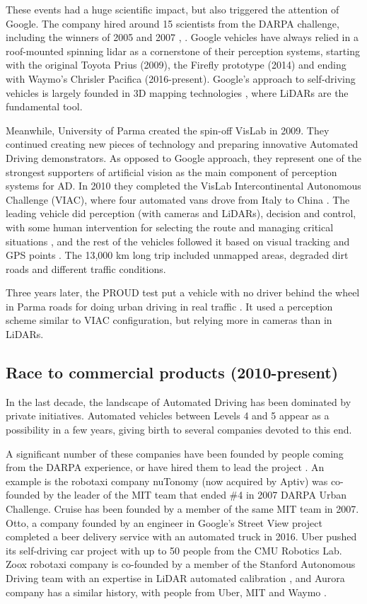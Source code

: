 These events had a huge scientific impact, but also triggered the attention of 
Google. The company hired around 15 scientists from the DARPA challenge, 
including the winners of 2005 and 2007 \cite{Montemerlo2008}, 
\cite{Levinson2011}. Google vehicles have always relied in a roof-mounted 
spinning lidar as a cornerstone of their perception systems, starting with the 
original Toyota Prius (2009), the Firefly prototype (2014) and ending with 
Waymo's Chrisler Pacifica (2016-present).
Google's approach to self-driving vehicles is largely founded in 3D mapping technologies \cite{Chapell2016}, where LiDARs are the fundamental tool.

Meanwhile, University of Parma created the spin-off VisLab in 2009. They 
continued creating new pieces of technology and preparing innovative Automated 
Driving demonstrators. As opposed to Google approach, they represent one of the 
strongest supporters of artificial vision as the main component of perception 
systems for AD. In 2010 they completed the VisLab Intercontinental Autonomous 
Challenge (VIAC), where four automated vans drove from Italy to China 
\cite{Bertozzi2011}.
The leading vehicle did perception (with cameras and LiDARs), decision and 
control, with some human intervention for selecting the route and managing 
critical situations \cite{Broggi2012}, and the rest of the vehicles followed 
it based on visual tracking and GPS points \cite{Broggi2012a}. The 13,000 km 
long trip included unmapped areas, degraded dirt roads and different traffic 
conditions. 

Three years later, the PROUD test put a vehicle with no driver behind the wheel in Parma roads for doing urban driving in real traffic \cite{Broggi2013}. It used a perception scheme similar to VIAC configuration, but relying more in cameras than in LiDARs.
 
\subsection{Race to commercial products (2010-present)}
 
In the last decade, the landscape of Automated Driving has been dominated by private initiatives. Automated vehicles between Levels 4 and 5 appear as a possibility in a few years, giving birth to several companies devoted to this end. 

A significant number of these companies have been founded by people coming from 
the DARPA experience, or have hired them to lead the project 
\cite{Chapell2016}. An example is the robotaxi company nuTonomy (now acquired 
by Aptiv) was co-founded by the leader of the MIT team that ended \#4 in 2007 
DARPA Urban Challenge. Cruise has been founded by a member of the same MIT team 
in 2007.
Otto, a company founded by an engineer in Google's 
Street View project completed a beer delivery service with an automated truck in 2016.
Uber pushed its self-driving car project with up to 50 people from the CMU 
Robotics Lab. Zoox robotaxi company is co-founded by a member of the Stanford 
Autonomous Driving team with an expertise in LiDAR automated calibration 
\cite{Levinson2011a}, and Aurora company has a similar history, with people from Uber, MIT and Waymo \cite{Anderson2013}.

